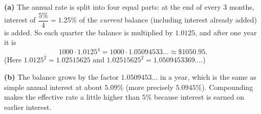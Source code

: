\textbf{(a)} The annual rate is split into four equal parts: at the end of every $3$ months, interest of $\dfrac{5\%}{4}=1.25\%$ of the \emph{current} balance (including interest already added) is added. So each quarter the balance is multiplied by $1.0125$, and after one year it is
\[1000\cdot1.0125^4=1000\cdot1.05094533\ldots\approx\boxed{\$1050.95}.\]
(Here $1.0125^2=1.02515625$ and $1.02515625^2=1.0509453369\ldots$.)

\textbf{(b)} The balance grows by the factor $1.0509453\ldots$ in a year, which is the same as simple annual interest at about $\boxed{5.09\%}$ (more precisely $5.0945\%$). Compounding makes the effective rate a little higher than $5\%$ because interest is earned on earlier interest.

